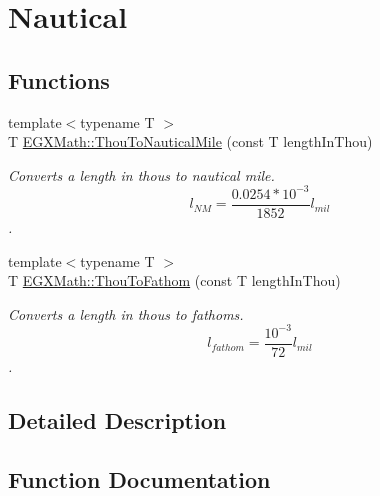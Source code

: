 \hypertarget{group___e_g_x_math-_conversions-_length_conversions-_imperial-_thou-_nautical}{}\section{Nautical}
\label{group___e_g_x_math-_conversions-_length_conversions-_imperial-_thou-_nautical}
\subsection*{Functions}
\begin{DoxyCompactItemize}
\item 
{\footnotesize template$<$typename T $>$ }\\T \mbox{\hyperlink{group___e_g_x_math-_conversions-_length_conversions-_imperial-_thou-_nautical_gadd6e063edb182d6461d6c35f4070072d}{E\+G\+X\+Math\+::\+Thou\+To\+Nautical\+Mile}} (const T length\+In\+Thou)
\begin{DoxyCompactList}\small\item\em Converts a length in thous to nautical mile. \[ l_{NM}= \frac{0.0254 * 10^{-3}}{1852} l_{mil} \]. \end{DoxyCompactList}\item 
{\footnotesize template$<$typename T $>$ }\\T \mbox{\hyperlink{group___e_g_x_math-_conversions-_length_conversions-_imperial-_thou-_nautical_ga00618d821c88aa01407d6770bcb1c5de}{E\+G\+X\+Math\+::\+Thou\+To\+Fathom}} (const T length\+In\+Thou)
\begin{DoxyCompactList}\small\item\em Converts a length in thous to fathoms. \[ l_{fathom}= \frac{10^{-3}}{72} l_{mil} \]. \end{DoxyCompactList}\end{DoxyCompactItemize}


\subsection{Detailed Description}


\subsection{Function Documentation}
\mbox{\label{group___e_g_x_math-_conversions-_length_conversions-_imperial-_thou-_nautical_ga00618d821c88aa01407d6770bcb1c5de}} 
